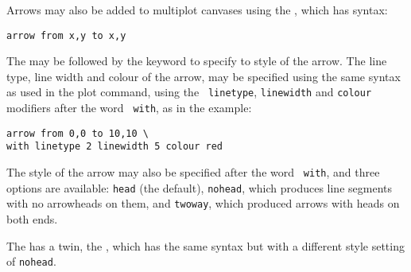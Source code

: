 Arrows may also be added to multiplot canvases using the , which
has syntax:

\begin{verbatim}
arrow from x,y to x,y
\end{verbatim}

The  may be followed by the  keyword to specify to
style of the arrow. The line type, line width and colour of the arrow, may be
specified using the same syntax as used in the plot command, using the {\tt
linetype}, {\tt linewidth} and {\tt colour} modifiers after the word {\tt
with}, as in the example:

\begin{verbatim}
arrow from 0,0 to 10,10 \
with linetype 2 linewidth 5 colour red
\end{verbatim}

\noindent The style of the arrow may also be specified after the word {\tt
with}, and three options are available: {\tt head} (the default), {\tt nohead},
which produces line segments with no arrowheads on them, and {\tt twoway},
which produced arrows with heads on both ends.

The  has a twin, the , which has the same syntax
but with a different style setting of {\tt nohead}.

